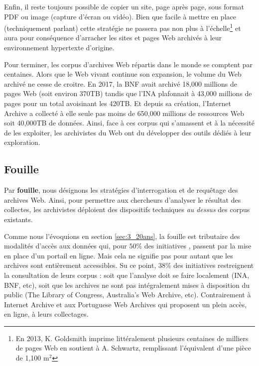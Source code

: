 \documentclass[symmetric,justified,marginals=raggedouter]{tufte-book}
\begin{document}
Enfin, il reste toujours possible de copier un site, page après page, sous format PDF ou image (capture d'écran ou vidéo). Bien que facile à mettre en place (techniquement parlant) cette stratégie ne passera pas non plus à l'échelle\footnote{En 2013, K. Goldsmith imprime littéralement plusieurs centaines de milliers de pages Web en soutient à A. Schwartz, remplissant l'équivalent d'une pièce de 1,100 $\mathrm{m}^2$} et aura pour conséquence d'arracher les sites et pages Web archivés à leur environnement hypertexte d'origine.  

Pour terminer, les corpus d'archives Web répartis dans le monde se comptent par centaines. Alors que le Web vivant continue son expansion, le volume du Web archivé ne cesse de croitre. En 2017, la BNF avait archivé 18,000 millions de pages Web (soit environ 370TB) tandis que l'INA plafonnait à 43,000 millions de pages pour un total avoisinant les 420TB. Et depuis sa création, l'Internet Archive a collecté à elle seule pas moins de 650,000 millions de ressources Web soit 40,000TB de données. Ainsi, face à ces corpus qui s'amassent et à la nécessité de les exploiter, les archivistes du Web ont du développer des outils dédiés à leur exploration.

\subsection{Fouille}

\noindent Par \textbf{fouille}, nous désignons les stratégies d'interrogation et de requêtage des archives Web. Ainsi, pour permettre aux chercheurs d'ana\-lyser le résultat des collectes, les archivistes déploient des dispositifs techniques \textit{au dessus} des corpus existants. 

Comme nous l'évoquions en section \ref{sec:3_20ans}, la fouille est tributaire des modalités d'accès aux données qui, pour $50\%$ des initiatives \citep{costa_survey_2013}, passent par la mise en place d'un portail en ligne. Mais cela ne signifie pas pour autant que les archives sont entièrement accessibles. Su ce point, $38\%$ des initiatives restreignent la consultation de leurs corpus : soit que l'analyse doit se faire localement (INA, BNF, etc), soit que les archives ne sont pas intégralement mises à disposition du public (The Library of Congress, Australia's Web Archive, etc). Contrairement à Internet Archive et aux Portuguese Web Archives qui proposent un plein accès, en ligne, à leurs collectages.  
\end{document}
